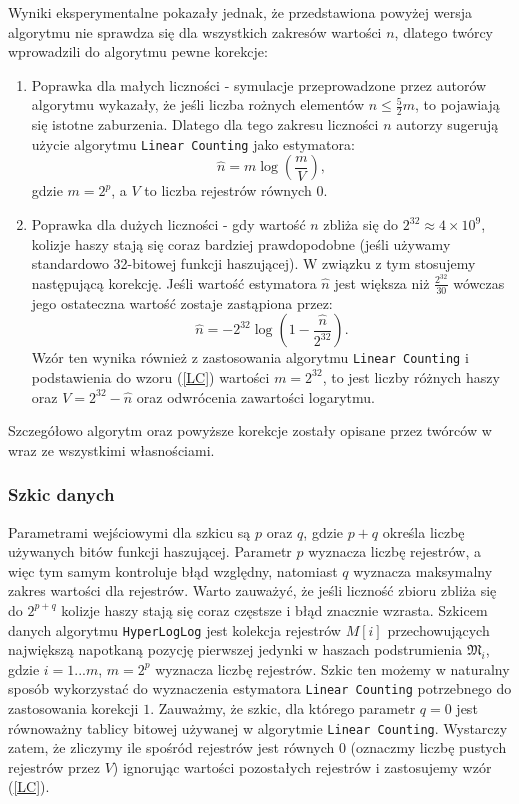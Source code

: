 Wyniki eksperymentalne pokazały jednak, że przedstawiona powyżej wersja algorytmu nie sprawdza się dla wszystkich zakresów wartości $n$, dlatego twórcy wprowadzili do algorytmu pewne korekcje:
\begin{enumerate}
    \item Poprawka dla małych liczności - symulacje przeprowadzone przez autorów algorytmu wykazały, że jeśli liczba rożnych elementów $n \le \frac{5}{2}m$, 
    to pojawiają się istotne zaburzenia. Dlatego dla tego zakresu liczności $n$ autorzy sugerują użycie  algorytmu \texttt{Linear Counting} \cite{linear} jako estymatora:
    \begin{equation}
    \hat{n} = {m}\log(\frac{m}{V}),
    \label{LC}
    \end{equation}
    gdzie $m = 2^p$, a $V$ to liczba rejestrów równych $0$.
    
    \item Poprawka dla dużych liczności - gdy wartość $n$ zbliża się do $2^{32} \approx 4 \times 10^9$, kolizje haszy stają się coraz bardziej prawdopodobne (jeśli używamy standardowo 32-bitowej funkcji haszującej). 
    W związku z tym stosujemy następującą korekcję. Jeśli wartość estymatora $\hat{n}$ jest większa niż $\frac{2^{32}}{30}$ wówczas jego ostateczna wartość zostaje zastąpiona przez:
    \begin{equation}
	    \hat{n} = {-2}^{32}\log(1 - \frac{\hat{n}}{2^{32}}).
    \end{equation}
    Wzór ten wynika również z zastosowania algorytmu \texttt{Linear Counting} i podstawienia do wzoru (\ref{LC}) wartości $m = 2^{32}$, to jest liczby różnych haszy  oraz $V = 2^{32} - \hat{n}$ oraz odwrócenia zawartości logarytmu.
\end{enumerate}
Szczegółowo algorytm oraz powyższe korekcje zostały opisane przez twórców w \cite{hll} wraz ze wszystkimi własnościami.

\subsubsection{Szkic danych}
\label{HLL_sketch}
Parametrami wejściowymi dla szkicu są $p$ oraz $q$, gdzie $p + q$ określa liczbę używanych bitów funkcji haszującej. Parametr $p$ wyznacza liczbę rejestrów, a więc tym samym kontroluje błąd względny, natomiast $q$ wyznacza maksymalny zakres wartości dla rejestrów. Warto zauważyć, że jeśli liczność zbioru zbliża się do $2^{p+q}$ kolizje haszy stają się coraz częstsze i błąd znacznie wzrasta. 
Szkicem danych algorytmu \texttt{HyperLogLog} jest kolekcja rejestrów $M[i]$ przechowujących największą napotkaną pozycję pierwszej jedynki w haszach podstrumienia $\mathfrak{M}_i$, gdzie $i = 1 ... m$, $m = 2^p$ wyznacza liczbę rejestrów. Szkic ten możemy w naturalny sposób wykorzystać do wyznaczenia estymatora \texttt{Linear Counting} potrzebnego do zastosowania korekcji $1.$ Zauważmy, że szkic, dla którego parametr $q = 0$ jest równoważny tablicy bitowej używanej w algorytmie \texttt{Linear Counting}. Wystarczy zatem, że zliczymy ile spośród rejestrów jest równych $0$ (oznaczmy liczbę pustych rejestrów przez $V$) ignorując wartości pozostałych rejestrów i zastosujemy wzór (\ref{LC}).

